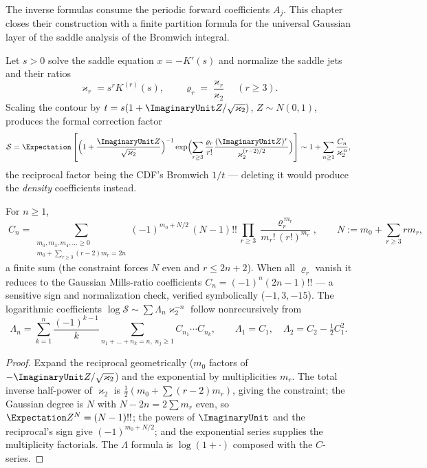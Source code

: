 The inverse formulas consume the periodic forward coefficients
$A_j$.  This chapter closes their construction with a finite
partition formula for the universal Gaussian layer of the saddle
analysis of the Bromwich integral.

Let $s>0$ solve the saddle equation $x=-K'(s)$ and normalize the
saddle jets and their ratios
\begin{equation}
 \varkappa_r=s^{r}K^{(r)}(s),
 \qquad
 \varrho_r=\frac{\varkappa_r}{\varkappa_2}
 \quad(r\ge3).
 \label{ao:eq:saddle-jets}
\end{equation}
Scaling the contour by $t=s(1+\ImaginaryUnit Z/\sqrt{\varkappa_2})$,
$Z\sim N(0,1)$, produces the formal correction factor
\begin{equation}
 \mathcal S=\Expectation\left[
 \Bigl(1+\frac{\ImaginaryUnit Z}{\sqrt{\varkappa_2}}\Bigr)^{-1}
 \exp\Bigl(\sum_{r\ge3}\frac{\varrho_r}{r!}
 \frac{(\ImaginaryUnit Z)^{r}}{\varkappa_2^{(r-2)/2}}\Bigr)
 \right]
 \sim1+\sum_{n\ge1}\frac{C_n}{\varkappa_2^{\,n}},
 \label{ao:eq:S-def}
\end{equation}
the reciprocal factor being the CDF's Bromwich $1/t$ --- deleting it
would produce the \emph{density} coefficients instead.

\begin{theorem}
\label{ao:thm:Cn}
For $n\ge1$,
\begin{equation}
 \boxed{\;
 C_n=\sum_{\substack{m_0,m_3,m_4,\dots\ge0\\
 m_0+\sum_{r\ge3}(r-2)m_r=2n}}
 (-1)^{m_0+N/2}\,(N-1)!!\,
 \prod_{r\ge3}\frac{\varrho_r^{\,m_r}}{m_r!\,(r!)^{m_r}},
 \qquad
 N:=m_0+\sum_{r\ge3}rm_r,
 \;}
 \label{ao:eq:Cn-partition}
\end{equation}
a finite sum (the constraint forces $N$ even and $r\le2n+2$).  When
all $\varrho_r$ vanish it reduces to the Gaussian Mills-ratio
coefficients $C_n=(-1)^{n}(2n-1)!!$ --- a sensitive sign and
normalization check, verified symbolically ($-1,3,-15$).  The
logarithmic coefficients
$\log\mathcal S\sim\sum\Lambda_n\varkappa_2^{-n}$ follow
nonrecursively from
\begin{equation}
 \Lambda_n=\sum_{k=1}^{n}\frac{(-1)^{k-1}}k
 \sum_{n_1+\dots+n_k=n,\;n_j\ge1}
 C_{n_1}\cdots C_{n_k},
 \qquad
 \Lambda_1=C_1,\quad
 \Lambda_2=C_2-\tfrac12C_1^{2}.
 \label{ao:eq:Lambda}
\end{equation}
\end{theorem}

\begin{proof}
Expand the reciprocal geometrically ($m_0$ factors of
$-\ImaginaryUnit Z/\sqrt{\varkappa_2}$) and the exponential by multiplicities
$m_r$.  The total inverse half-power of $\varkappa_2$ is
$\tfrac12(m_0+\sum(r-2)m_r)$, giving the constraint; the Gaussian
degree is $N$ with $N-2n=2\sum m_r$ even, so
$\Expectation Z^{N}=(N-1)!!$; the powers of $\ImaginaryUnit$ and the reciprocal's sign
give $(-1)^{m_0+N/2}$; and the exponential series supplies the
multiplicity factorials.  The $\Lambda$ formula is
$\log(1+\cdot)$ composed with the $C$-series.
\end{proof}

